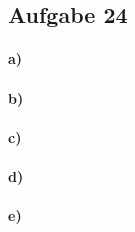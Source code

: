\subsection*{Aufgabe 24}

\paragraph*{a)}


\paragraph*{b)}


\paragraph*{c)}


\paragraph*{d)}


\paragraph*{e)}

